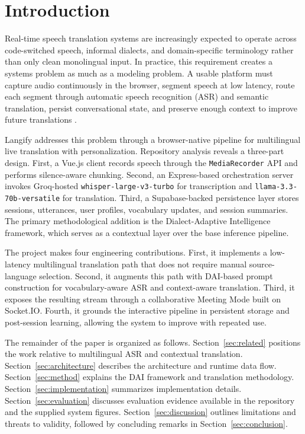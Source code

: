 \documentclass[twocolumn]{svjour3}
\begin{document}
\section{Introduction}
\label{intro}
Real-time speech translation systems are increasingly expected to operate across code-switched speech, informal dialects, and domain-specific terminology rather than only clean monolingual input. In practice, this requirement creates a systems problem as much as a modeling problem. A usable platform must capture audio continuously in the browser, segment speech at low latency, route each segment through automatic speech recognition (ASR) and semantic translation, persist conversational state, and preserve enough context to improve future translations \cite{RefWhisper,RefLlama,RefCodeSwitch}.

Langify addresses this problem through a browser-native pipeline for multilingual live translation with personalization. Repository analysis reveals a three-part design. First, a Vue.js client records speech through the \texttt{MediaRecorder} API and performs silence-aware chunking. Second, an Express-based orchestration server invokes Groq-hosted \mbox{\texttt{whisper-large-v3-turbo}} for transcription and \mbox{\texttt{llama-3.3-70b-versatile}} for translation. Third, a Supabase-backed persistence layer stores sessions, utterances, user profiles, vocabulary updates, and session summaries. The primary methodological addition is the Dialect-Adaptive Intelligence framework, which serves as a contextual layer over the base inference pipeline.

The project makes four engineering contributions. First, it implements a low-latency multilingual translation path that does not require manual source-language selection. Second, it augments this path with DAI-based prompt construction for vocabulary-aware ASR and context-aware translation. Third, it exposes the resulting stream through a collaborative Meeting Mode built on Socket.IO. Fourth, it grounds the interactive pipeline in persistent storage and post-session learning, allowing the system to improve with repeated use.

The remainder of the paper is organized as follows. Section~\ref{sec:related} positions the work relative to multilingual ASR and contextual translation. Section~\ref{sec:architecture} describes the architecture and runtime data flow. Section~\ref{sec:method} explains the DAI framework and translation methodology. Section~\ref{sec:implementation} summarizes implementation details. Section~\ref{sec:evaluation} discusses evaluation evidence available in the repository and the supplied system figures. Section~\ref{sec:discussion} outlines limitations and threats to validity, followed by concluding remarks in Section~\ref{sec:conclusion}.
\end{document}
